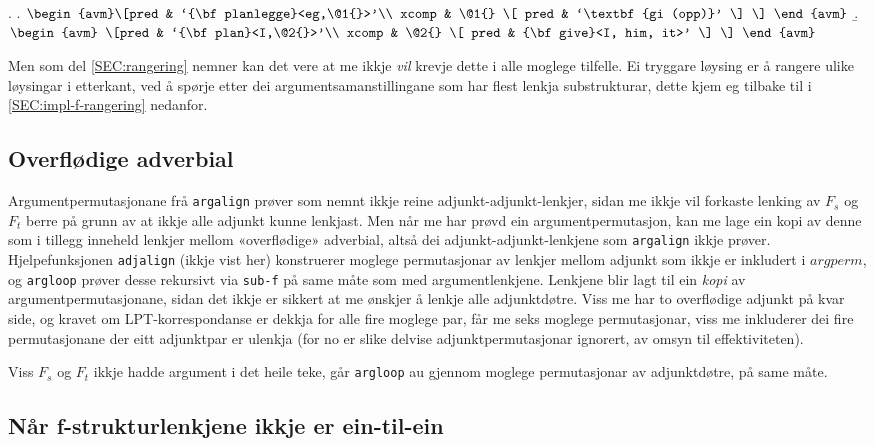 \documentclass[12pt,a4paper,oneside,draft]{report}
\newcommand{\p}[1]{`\textbf{#1}'}
\begin{document}
{\avmoptions{}
\ex. \a.  $\begin{avm}\[pred & `{\bf planlegge}<eg,\@1{}>'\\
   xcomp & \@1{} \[  pred & \p{gi (opp)} \] \] \end{avm}$
  \b. $\begin{avm} \[pred & `{\bf plan}<I,\@2{}>'\\
   xcomp & \@2{} \[  pred & {\bf give}<I, him, it>' \] \] \end{avm}$

}

Men som del \ref{SEC:rangering} nemner kan det vere at me ikkje \emph{vil}
krevje dette i alle moglege tilfelle. Ei tryggare løysing er å rangere
ulike løysingar i etterkant, ved å spørje etter dei
argumentsamanstillingane som har flest lenkja substrukturar, dette
kjem eg tilbake til i \ref{SEC:impl-f-rangering} nedanfor.
\subsection{Overflødige adverbial}
\label{sec-4.1.1}

   \label{SEC:impl-adjalign}

Argumentpermutasjonane frå \texttt{argalign} prøver som nemnt ikkje reine
 adjunkt-adjunkt-lenkjer, sidan me ikkje vil forkaste lenking av $F_s$
 og $F_t$ berre på grunn av at ikkje alle adjunkt kunne lenkjast. Men
 når me har prøvd ein argumentpermutasjon, kan me lage ein kopi av
 denne som i tillegg inneheld lenkjer mellom «overflødige» adverbial,
 altså dei adjunkt-adjunkt-lenkjene som \texttt{argalign} ikkje
 prøver. Hjelpefunksjonen \texttt{adjalign} (ikkje vist her) konstruerer
 moglege permutasjonar av lenkjer mellom adjunkt som ikkje er
 inkludert i $argperm$, og \texttt{argloop} prøver desse rekursivt via
 \texttt{sub-f} på same måte som med argumentlenkjene. Lenkjene blir lagt til
 ein \emph{kopi} av argumentpermutasjonane, sidan det ikkje er sikkert at
 me ønskjer å lenkje alle adjunktdøtre. Viss me har to overflødige
 adjunkt på kvar side, og kravet om LPT\hyp{}korrespondanse er dekkja
 for alle fire moglege par, får me seks moglege permutasjonar, viss me
 inkluderer dei fire permutasjonane der eitt adjunktpar er ulenkja
 (for no er slike delvise adjunktpermutasjonar ignorert, av omsyn til
 effektiviteten).

Viss $F_s$ og $F_t$ ikkje hadde argument i det heile teke, går
\texttt{argloop} au gjennom moglege permutasjonar av adjunktdøtre, på same
måte.
\subsection{Når f\hyp{}strukturlenkjene ikkje er ein-til-ein}
\label{sec-4.1.2}
\end{document}
